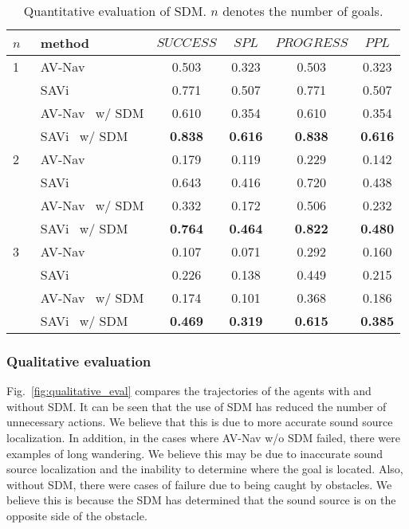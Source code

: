 \begin{table}[tb]
    \setlength{\tabcolsep}{3pt}
    \centering
    \caption{
        Quantitative evaluation of SDM.
        $n$ denotes the number of goals.
    }
    \label{tab:dm_results}
    \begin{tabular}{@{}llcccc@{}}
    \toprule
        $n$~ & method & $SUCCESS$ & $SPL$ & $PROGRESS$ & $PPL$ \\ \midrule
        1 & AV-Nav~\cite{chen2020soundspaces} & 0.503 & 0.323 & 0.503 & 0.323  \\
        & SAVi~\cite{chen2021semantic} & 0.771 & 0.507 & 0.771 & 0.507 \\
        & AV-Nav~\cite{chen2020soundspaces} w/ SDM & 0.610 & 0.354 & 0.610 & 0.354 \\
        & SAVi~\cite{chen2021semantic} w/ SDM & \textbf{0.838} & \textbf{0.616} & \textbf{0.838} & \textbf{0.616} \\ \midrule
        2 & AV-Nav~\cite{chen2020soundspaces} & 0.179 & 0.119 & 0.229 & 0.142  \\
        & SAVi~\cite{chen2021semantic} & 0.643 & 0.416 & 0.720 & 0.438 \\
        & AV-Nav~\cite{chen2020soundspaces} w/ SDM & 0.332 & 0.172 & 0.506 & 0.232 \\
        & SAVi~\cite{chen2021semantic} w/ SDM & \textbf{0.764} & \textbf{0.464} & \textbf{0.822} & \textbf{0.480} \\ \midrule
        3 & AV-Nav~\cite{chen2020soundspaces} & 0.107 & 0.071 & 0.292 & 0.160 \\
        & SAVi~\cite{chen2021semantic} & 0.226 & 0.138 & 0.449 & 0.215 \\
        & AV-Nav~\cite{chen2020soundspaces} w/ SDM & 0.174 & 0.101 & 0.368 & 0.186 \\
        & SAVi~\cite{chen2021semantic} w/ SDM & \textbf{0.469} & \textbf{0.319} & \textbf{0.615} & \textbf{0.385} \\ \bottomrule
    \end{tabular}
\end{table}



\subsubsection{Qualitative evaluation}




Fig.~\ref{fig:qualitative_eval} compares the trajectories of the agents with and without SDM.
It can be seen that the use of SDM has reduced the number of unnecessary actions.
We believe that this is due to more accurate sound source localization.
In addition, in the cases where AV-Nav w/o SDM failed, there were examples of long wandering.
We believe this may be due to inaccurate sound source localization and the inability to determine where the goal is located.
Also, without SDM, there were cases of failure due to being caught by obstacles.
We believe this is because the SDM has determined that the sound source is on the opposite side of the obstacle.
